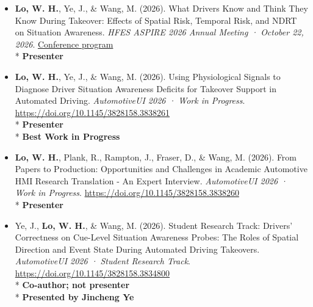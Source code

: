 \documentclass[11pt]{article}
\begin{document}
\begin{itemize}[leftmargin=*, topsep=0pt, itemsep=6pt]

  \item \begin{samepage}\textbf{Lo, W. H.}, Ye, J., \& Wang, M. (2026). What Drivers Know and Think They Know During Takeover: Effects of Spatial Risk, Temporal Risk, and NDRT on Situation Awareness. \textit{HFES ASPIRE 2026 Annual Meeting · October 22, 2026}. \href{https://hfesam2026.conference-program.com/presentation/?id=POST389\&sess=sess246}{Conference program}\\* \textbf{Presenter}
  \par\end{samepage}

  \item \begin{samepage}\textbf{Lo, W. H.}, Ye, J., \& Wang, M. (2026). Using Physiological Signals to Diagnose Driver Situation Awareness Deficits for Takeover Support in Automated Driving. \textit{AutomotiveUI 2026 · Work in Progress}. \href{https://doi.org/10.1145/3828158.3838261}{\url{https://doi.org/10.1145/3828158.3838261}}\\* \textbf{Presenter}\\* \textbf{Best Work in Progress}
  \par\end{samepage}

  \item \begin{samepage}\textbf{Lo, W. H.}, Plank, R., Rampton, J., Fraser, D., \& Wang, M. (2026). From Papers to Production: Opportunities and Challenges in Academic Automotive HMI Research Translation - An Expert Interview. \textit{AutomotiveUI 2026 · Work in Progress}. \href{https://doi.org/10.1145/3828158.3838260}{\url{https://doi.org/10.1145/3828158.3838260}}\\* \textbf{Presenter}
  \par\end{samepage}

  \item \begin{samepage}Ye, J., \textbf{Lo, W. H.}, \& Wang, M. (2026). Student Research Track: Drivers' Correctness on Cue-Level Situation Awareness Probes: The Roles of Spatial Direction and Event State During Automated Driving Takeovers. \textit{AutomotiveUI 2026 · Student Research Track}. \href{https://doi.org/10.1145/3828158.3834800}{\url{https://doi.org/10.1145/3828158.3834800}}\\* \textbf{Co-author; not presenter}\\* \textbf{Presented by Jincheng Ye}
  \par\end{samepage}


\end{itemize}
\end{document}
